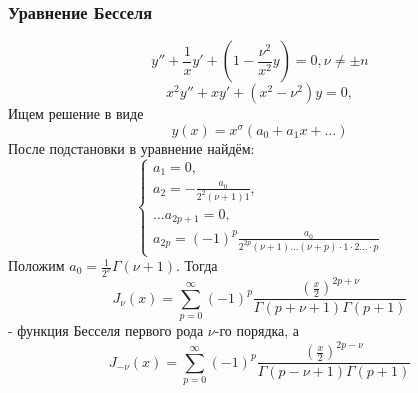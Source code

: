 \documentclass[11pt]{article}
\begin{document}
\subsubsection{Уравнение Бесселя}
\label{sec:org62d1f51}
\begin{equation}
y'' + \frac1xy' + \left(1 - \frac{\nu^2}{x^2}y\right) = 0, \nu \neq \pm n
\end{equation}
\begin{equation}
x^2y'' + xy' + (x^2 - \nu^2)y = 0,
\end{equation}
Ищем решение в виде
\begin{equation}
y(x) = x^{\sigma}(a_0 + a_1x + \ldots)
\end{equation}
После подстановки в уравнение найдём:
\begin{equation}
\begin{cases}
a_1 = 0, \\
a_2 = -\frac{a_0}{2^2(\nu + 1)1}, \\
\ldots
a_{2p + 1} = 0, \\
a_{2p} = (-1)^p\frac{a_0}{2^{2p}(\nu + 1)\ldots(\nu + p)\cdot1\cdot2\ldots\cdot p}
\end{cases}
\end{equation}
Положим $a_0 = \frac1{2^{\nu}}\Gamma(\nu + 1)$. Тогда
\begin{equation}
J_{\nu}(x) = \sum_{p = 0}^{\infty}(-1)^p\frac{\left(\frac{x}2\right)^{2p + \nu}}{\Gamma(p + \nu + 1)\Gamma(p + 1)}
\end{equation}
- функция Бесселя первого рода $\nu$-го порядка, а
\begin{equation}
J_{-\nu}(x) = \sum_{p = 0}^{\infty}(-1)^p\frac{\left(\frac{x}2\right)^{2p-\nu}}{\Gamma(p - \nu + 1)\Gamma(p + 1)}
\end{equation}
\end{document}
